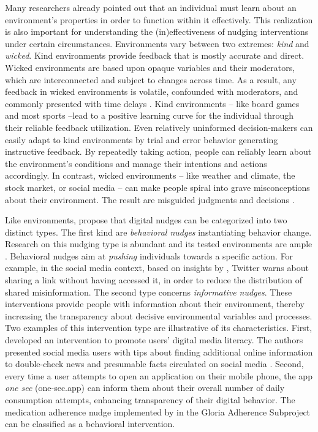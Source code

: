 \documentclass[reflection, authordate]{jote-new-article}
\begin{document}
Many researchers \parencites{Bail2021}{Thomas1983}{Gigerenzer2011}{Gigerenzer2002}{Simon1956} already pointed out that an individual must learn about an environment’s properties in order to function within it effectively. This realization is also important for understanding the (in)effectiveness of nudging interventions under certain circumstances. Environments vary between two extremes: \emph{kind }and \emph{wicked}. Kind environments provide feedback that is mostly accurate and direct. Wicked environments are based upon opaque variables and their moderators, which are interconnected and subject to changes across time. As a result, any feedback in wicked environments is volatile, confounded with moderators, and commonly presented with time delays \parencite{Hogarth2001}. Kind environments – like board games and most sports –lead to a positive learning curve for the individual through their reliable feedback utilization. Even relatively uninformed decision-makers can easily adapt to kind environments by trial and error behavior generating instructive feedback. By repeatedly taking action, people can reliably learn about the environment’s conditions and manage their intentions and actions accordingly. In contrast, wicked environments – like weather and climate, the stock market, or social media – can make people spiral into grave misconceptions about their environment. The result are misguided judgments and decisions \parencites[e.g.][]{Denrell2001}{Einhorn1978}{Feiler2012}{Koehler2009}.



Like environments, \textcite{Grüning2022a} propose that digital nudges can be categorized into two distinct types. The first kind are \emph{behavioral nudges} instantiating behavior change. Research on this nudging type is abundant and its tested environments are ample \parencites[see e.g.][]{Daley2018}{Glanz2017}{Pennycook2021}{Voelkel2021}. Behavioral nudges aim at \emph{pushing }individuals towards a specific action. For example, in the social media context, based on insights by \textcite{Pennycook2021}, Twitter warns about sharing a link without having accessed it, in order to reduce the distribution of shared misinformation. The second type concerns \emph{informative nudges}. These interventions provide people with information about their environment, thereby increasing the transparency about decisive environmental variables and processes. Two examples of this intervention type are illustrative of its characteristics. First, \textcite{Guess2020} developed an intervention to promote users’ digital media literacy. The authors presented social media users with tips about finding additional online information to double-check news and presumable facts circulated on social media \parencites[see a review of the intervention, Prosocial Design][]{NetworkND}. Second, every time a user attempts to open an application on their mobile phone, the app \emph{one sec }(one-sec.app) can inform them about their overall number of daily consumption attempts, enhancing transparency of their digital behavior. The medication adherence nudge implemented by \textcite{Hartman2021} in the Gloria Adherence Subproject can be classified as a behavioral intervention.
\end{document}
